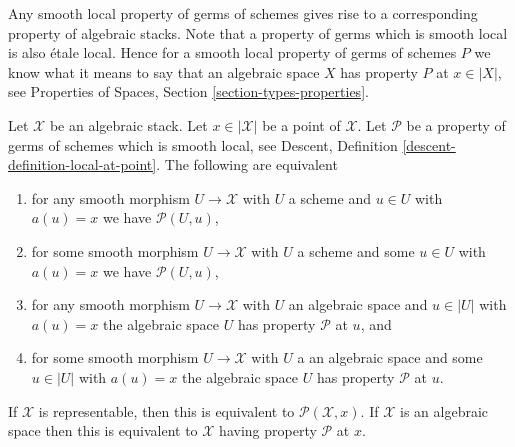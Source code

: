 \noindent
Any smooth local property of germs of schemes gives rise to a corresponding
property of algebraic stacks. Note that a property of germs which is smooth
local is also \'etale local. Hence for a smooth local property of germs of
schemes $P$ we know what it means to say that an algebraic space $X$ has
property $P$ at $x \in |X|$, see
Properties of Spaces, Section \ref{section-types-properties}.

\begin{lemma}
\label{lemma-local-source-target-at-point}
Let $\mathcal{X}$ be an algebraic stack.
Let $x \in |\mathcal{X}|$ be a point of $\mathcal{X}$.
Let $\mathcal{P}$ be a property of germs of schemes which is smooth local, see
Descent, Definition \ref{descent-definition-local-at-point}.
The following are equivalent
\begin{enumerate}
\item for any smooth morphism $U \to \mathcal{X}$ with $U$ a scheme
and $u \in U$ with $a(u) = x$ we have $\mathcal{P}(U, u)$,
\item for some smooth morphism $U \to \mathcal{X}$ with $U$ a scheme
and some $u \in U$ with $a(u) = x$ we have $\mathcal{P}(U, u)$,
\item for any smooth morphism $U \to \mathcal{X}$ with $U$ an algebraic space
and $u \in |U|$ with $a(u) = x$ the algebraic space $U$ has property
$\mathcal{P}$ at $u$, and
\item for some smooth morphism $U \to \mathcal{X}$ with $U$ a an
algebraic space and some $u \in |U|$ with $a(u) = x$ the algebraic space
$U$ has property $\mathcal{P}$ at $u$.
\end{enumerate}
If $\mathcal{X}$ is representable, then this is equivalent to
$\mathcal{P}(\mathcal{X}, x)$. If $\mathcal{X}$ is an algebraic space then
this is equivalent to $\mathcal{X}$ having property $\mathcal{P}$ at $x$.
\end{lemma}

